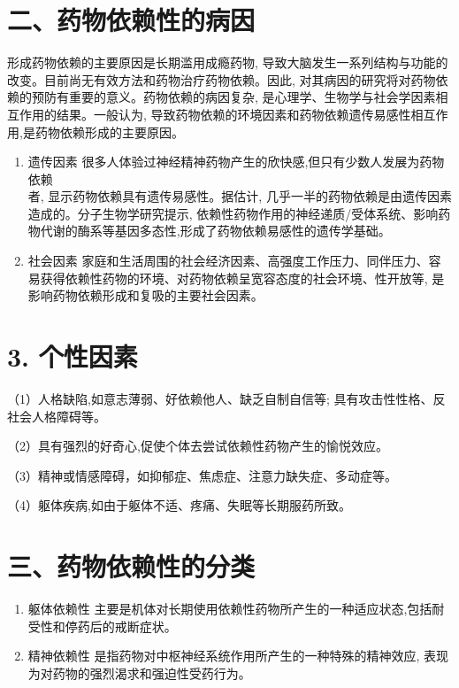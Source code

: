 \documentclass[10pt]{article}
\begin{document}
\section*{二、药物依赖性的病因}
形成药物依赖的主要原因是长期滥用成瘾药物, 导致大脑发生一系列结构与功能的改变。目前尚无有效方法和药物治疗药物依赖。因此, 对其病因的研究将对药物依赖的预防有重要的意义。药物依赖的病因复杂, 是心理学、生物学与社会学因素相互作用的结果。一般认为, 导致药物依赖的环境因素和药物依赖遗传易感性相互作用,是药物依赖形成的主要原因。

\begin{enumerate}
  \item 遗传因素 很多人体验过神经精神药物产生的欣快感,但只有少数人发展为药物依赖\\
者, 显示药物依赖具有遗传易感性。据估计, 几乎一半的药物依赖是由遗传因素造成的。分子生物学研究提示, 依赖性药物作用的神经递质/受体系统、影响药物代谢的酶系等基因多态性,形成了药物依赖易感性的遗传学基础。

  \item 社会因素 家庭和生活周围的社会经济因素、高强度工作压力、同伴压力、容易获得依赖性药物的环境、对药物依赖呈宽容态度的社会环境、性开放等, 是影响药物依赖形成和复吸的主要社会因素。

\end{enumerate}

\section*{3. 个性因素}
（1）人格缺陷,如意志薄弱、好依赖他人、缺乏自制自信等; 具有攻击性性格、反社会人格障碍等。

（2）具有强烈的好奇心,促使个体去尝试依赖性药物产生的愉悦效应。

（3）精神或情感障碍，如抑郁症、焦虑症、注意力缺失症、多动症等。

（4）躯体疾病,如由于躯体不适、疼痛、失眠等长期服药所致。

\section*{三、药物依赖性的分类}
\begin{enumerate}
  \item 躯体依赖性 主要是机体对长期使用依赖性药物所产生的一种适应状态,包括耐受性和停药后的戒断症状。

  \item 精神依赖性 是指药物对中枢神经系统作用所产生的一种特殊的精神效应, 表现为对药物的强烈渴求和强迫性受药行为。

\end{enumerate}
\end{document}
